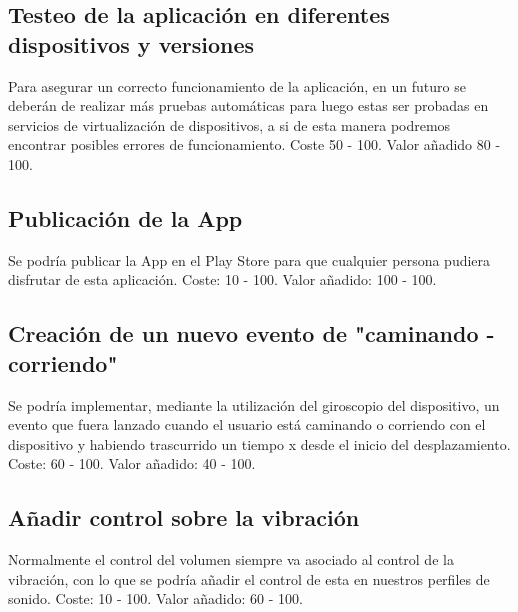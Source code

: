 \subsection{Testeo de la aplicación en diferentes dispositivos y versiones}
Para asegurar un correcto funcionamiento de la aplicación, en un futuro se deberán de realizar más pruebas automáticas para luego estas ser probadas en servicios de virtualización de dispositivos, a si de esta manera podremos encontrar posibles errores de funcionamiento.
Coste 50 - 100.
Valor añadido 80 - 100.

\subsection{Publicación de la App}
Se podría publicar la App en el Play Store para que cualquier persona pudiera disfrutar de esta aplicación.
Coste: 10 - 100.
Valor añadido: 100 - 100.

\subsection{Creación de un nuevo evento de "caminando - corriendo"}
Se podría implementar, mediante la utilización del giroscopio del dispositivo, un evento que fuera lanzado cuando el usuario está caminando o corriendo con el dispositivo y habiendo trascurrido un tiempo x desde el inicio del desplazamiento.
Coste: 60 - 100.
Valor añadido: 40 - 100.

\subsection{Añadir control sobre la vibración}
Normalmente el control del volumen siempre va asociado al control de la vibración, con lo que se podría añadir el control de esta en nuestros perfiles de sonido.
Coste: 10 - 100.
Valor añadido: 60 - 100.